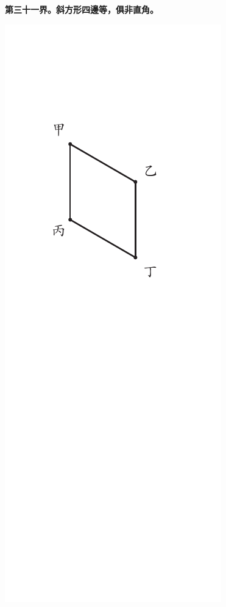 \documentclass[12pt,b5paper,landscape]{article}
\newcommand{\cthm}[1]{{
\vspace{8pt}

\bfseries #1}}
\begin{document}
\begin{multicols}{2}
\cthm{第三十一界。斜方形四邊等，俱非直角。}
\begin{center}
\includegraphics[angle=90]{eu21}
\end{center}


\end{multicols}
\end{document}
